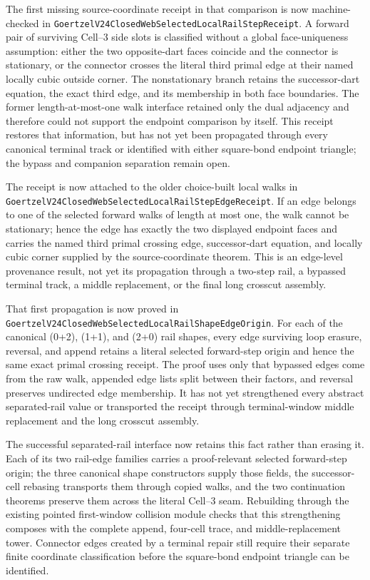 \documentclass[11pt]{article}
\theoremstyle{definition}
\begin{document}
The first missing source-coordinate receipt in that comparison is now
machine-checked in
\texttt{GoertzelV24ClosedWebSelectedLocalRailStepReceipt}.  A forward pair of
surviving Cell--3 side slots is classified without a global face-uniqueness
assumption: either the two opposite-dart faces coincide and the connector is
stationary, or the connector crosses the literal third primal edge at their
named locally cubic outside corner.  The nonstationary branch retains the
successor-dart equation, the exact third edge, and its membership in both face
boundaries.  The former length-at-most-one walk interface retained only the
dual adjacency and therefore could not support the endpoint comparison by
itself.  This receipt restores that information, but has not yet been
propagated through every canonical terminal track or identified with either
square-bond endpoint triangle; the bypass and companion separation remain
open.

The receipt is now attached to the older choice-built local walks in
\texttt{GoertzelV24ClosedWebSelectedLocalRailStepEdgeReceipt}.  If an edge
belongs to one of the selected forward walks of length at most one, the walk
cannot be stationary; hence the edge has exactly the two displayed endpoint
faces and carries the named third primal crossing edge, successor-dart
equation, and locally cubic corner supplied by the source-coordinate theorem.
This is an edge-level provenance result, not yet its propagation through a
two-step rail, a bypassed terminal track, a middle replacement, or the final
long crosscut assembly.

That first propagation is now proved in
\texttt{GoertzelV24ClosedWebSelectedLocalRailShapeEdgeOrigin}.  For each of
the canonical (0+2), (1+1), and (2+0) rail shapes, every edge surviving
loop erasure, reversal, and append retains a literal selected forward-step
origin and hence the same exact primal crossing receipt.  The proof uses only
that bypassed edges come from the raw walk, appended edge lists split between
their factors, and reversal preserves undirected edge membership.  It has not
yet strengthened every abstract separated-rail value or transported the
receipt through terminal-window middle replacement and the long crosscut
assembly.

The successful separated-rail interface now retains this fact rather than
erasing it.  Each of its two rail-edge families carries a proof-relevant
selected forward-step origin; the three canonical shape constructors supply
those fields, the successor-cell rebasing transports them through copied
walks, and the two continuation theorems preserve them across the literal
Cell--3 seam.  Rebuilding through the existing pointed first-window collision
module checks that this strengthening composes with the complete append,
four-cell trace, and middle-replacement tower.  Connector edges created by a
terminal repair still require their separate finite coordinate
classification before the square-bond endpoint triangle can be identified.
\end{document}
